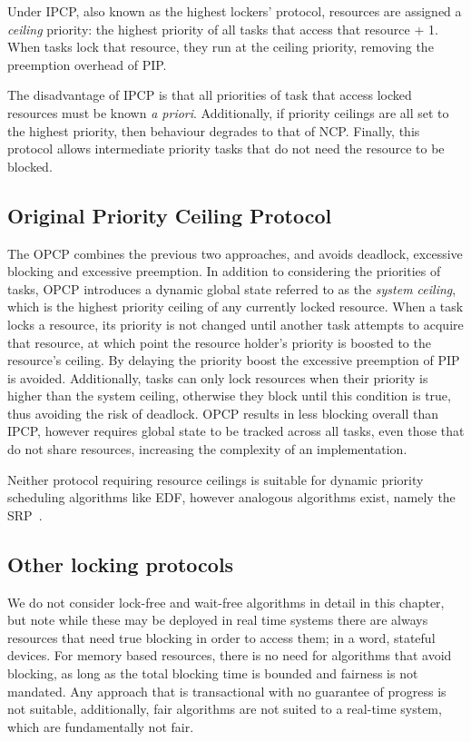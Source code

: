 Under \gls{IPCP}, also known as the highest lockers' protocol, resources are assigned a
\emph{ceiling} priority: the highest priority of all tasks that access that resource + 1.  When tasks
lock that resource, they run at the ceiling priority, removing the preemption overhead
of \gls{PIP}.

The disadvantage of \gls{IPCP} is that all priorities of task that access locked resources must be known \emph{a
priori}.  Additionally, if priority ceilings are all set to the highest priority, then behaviour
degrades to that of \gls{NCP}. Finally, this protocol allows intermediate priority tasks that do not need
the resource to be blocked. 

\subsection{Original Priority Ceiling Protocol}

The \gls{OPCP} combines the previous two approaches, and avoids deadlock, excessive blocking and
excessive preemption. In addition to considering the priorities of tasks, \gls{OPCP} introduces
a dynamic global state referred to as the \emph{system ceiling}, which is the highest
priority ceiling of any currently locked resource. When a task locks a resource, its priority 
is not changed until another task attempts to acquire that resource, at which point the resource
holder's priority is boosted to the resource's ceiling. By delaying the priority boost the excessive 
preemption of \gls{PIP} is avoided. Additionally, tasks can only lock resources
when their priority is higher than the system ceiling, otherwise they block until this condition is
true, thus avoiding the risk of deadlock. \gls{OPCP} results in less blocking overall than \gls{IPCP},
however requires global state to be tracked across all tasks, even those that do not share
resources, increasing the complexity of an implementation.

Neither protocol requiring resource ceilings is suitable for dynamic priority scheduling algorithms
like \gls{EDF}, however analogous algorithms exist, namely the \gls{SRP}~\citep{Baker_91}.

\subsection{Other locking protocols}

We do not consider lock-free and wait-free algorithms in detail in this chapter, but note while
these may be deployed in real time systems there are always resources that need true blocking in
order to access them; in a word, stateful devices. For memory based resources, there is no need for 
algorithms that avoid blocking, as long as the total blocking time is bounded 
and fairness is not mandated. Any approach that is 
transactional with no guarantee of progress is not suitable, additionally, fair algorithms are not suited to a
real-time system, which are fundamentally not fair. 

